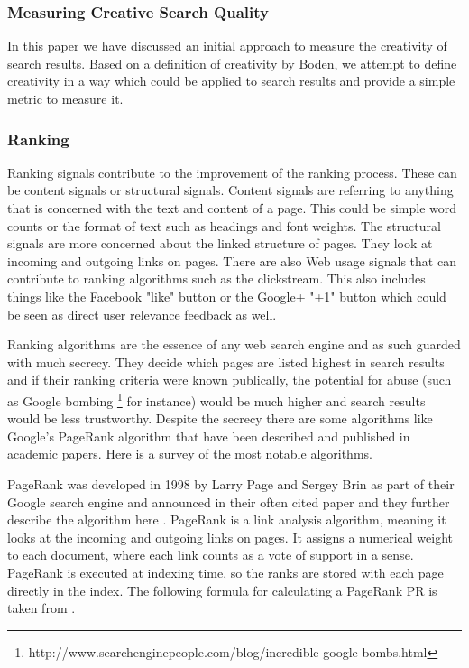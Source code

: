 \subsubsection{Measuring Creative Search Quality}

In this paper \citep{Sawle2013} we have discussed an initial approach to measure the creativity of search results. Based on a definition of creativity by Boden, we attempt to define creativity in a way which could be applied to search results and provide a simple metric to measure it.

\subsubsection{Ranking}

Ranking signals contribute to the improvement of the ranking process. These can be content signals or structural signals. Content signals are referring to anything that is concerned with the text and content of a page. This could be simple word counts or the format of text such as headings and font weights. The structural signals are more concerned about the linked structure of pages. They look at incoming and outgoing links on pages. There are also Web usage signals that can contribute to ranking algorithms such as the clickstream.  This also includes things like the Facebook "like" button or the Google+ "+1" button which could be seen as direct user relevance feedback as well.

Ranking algorithms are the essence of any web search engine and as such guarded with much secrecy. They decide which pages are listed highest in search results and if their ranking criteria were known publically, the potential for abuse (such as Google bombing \footnote{http://www.searchenginepeople.com/blog/incredible-google-bombs.html} for instance) would be much higher and search results would be less trustworthy. Despite the secrecy there are some algorithms like Google's PageRank algorithm that have been described and published in academic papers. Here is a survey of the most notable algorithms.

PageRank was developed in 1998 by Larry Page and Sergey Brin as part of their Google search engine and announced in their often cited paper \citep{Brin1998b} and they further describe the algorithm here \citep{Brin1998}. PageRank is a link analysis algorithm, meaning it looks at the incoming and outgoing links on pages. It assigns a numerical weight to each document, where each link counts as a vote of support in a sense. PageRank is executed at indexing time, so the ranks are stored with each page directly in the index. The following formula for calculating a PageRank PR is taken from \citep[p.472]{Baeza-Yates2011}.

